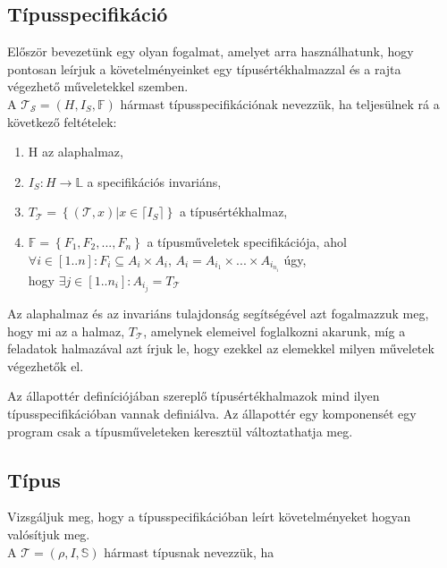 \documentclass[margin=0px]{article}
\begin{document}
	\subsection{Típusspecifikáció}
			
	Először bevezetünk egy olyan fogalmat, amelyet arra használhatunk, hogy pontosan
	leírjuk a követelményeinket egy típusértékhalmazzal és a rajta végezhető
	műveletekkel szemben.\\
	
	\noindent A $\mathcal{T_{S}}=(H,I_{S},\mathbb{F})$ hármast típusspecifikációnak nevezzük, ha
	teljesülnek rá a következő feltételek:
	
	\begin{enumerate}
		\item H az alaphalmaz,
		
		\item $I_{S} : H \to \mathbb{L} $ a specifikációs invariáns,
	
		\item $T_{\mathcal{T}} = \left\{ {(\mathcal{T},x) | x \in \lceil I_{S}} \rceil\right\}$ a típusértékhalmaz,
		
		\item $\mathbb{F} = \left\{ {F_{1},F_{2},...,F_{n}}\right\}$ a típusműveletek specifikációja, ahol\\
		$\forall i \in [1..n]: F_{i} \subseteq A_{i} \times A_{i}$, $A_{i} = A_{i_{1}} \times ... \times A_{i_{n_{i}}}$ úgy,\\
		hogy $\exists j \in [1..n_{i}]: A_{i_{j}} = T_{\mathcal{T}} $
	\end{enumerate}
	
	Az alaphalmaz és az invariáns tulajdonság segítségével azt fogalmazzuk meg,
	hogy mi az a halmaz, $T_{\mathcal{T}}$, amelynek elemeivel foglalkozni akarunk, míg a feladatok
	halmazával azt írjuk le, hogy ezekkel az elemekkel milyen műveletek végezhetők
	el.
	
	Az állapottér definíciójában szereplő típusértékhalmazok mind ilyen típusspecifikációban
	vannak definiálva. Az állapottér egy komponensét egy program csak a típusműveleteken keresztül változtathatja meg.
	\subsection{Típus}

	Vizsgáljuk meg, hogy a típusspecifikációban leírt követelményeket hogyan valósítjuk
	meg.\\
	
	\noindent A $\mathcal{T}=(\rho,I,\mathbb{S})$ hármast típusnak nevezzük, ha
\end{document}
